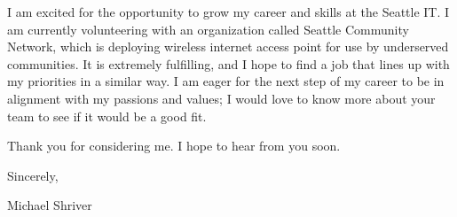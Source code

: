 \documentclass[10pt,oneside]{article}
\begin{document}
\vspace{\baselineskip}

I am excited for the opportunity to grow my career and skills at the Seattle IT. I am currently volunteering with an organization called Seattle Community Network, which is deploying wireless internet access point for use by underserved communities. It is extremely fulfilling, and I hope to find a job that lines up with my priorities in a similar way. I am eager for the next step of my career to be in alignment with my passions and values; I would love to know more about your team to see if it would be a good fit.

\vspace{\baselineskip}

Thank you for considering me. I hope to hear from you soon.

\vspace{\baselineskip}

Sincerely,

\vspace{\baselineskip}

Michael Shriver
\end{document}
